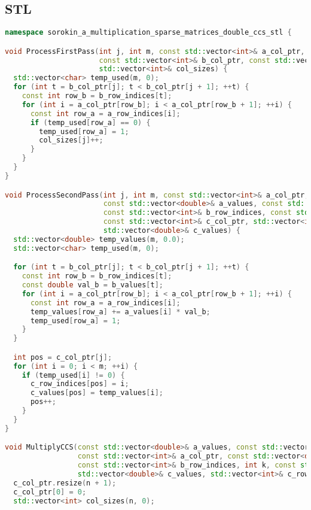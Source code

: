 \documentclass[12pt]{article}
\begin{document}
\subsection*{STL}
\begin{lstlisting}[language=C++]
namespace sorokin_a_multiplication_sparse_matrices_double_ccs_stl {

void ProcessFirstPass(int j, int m, const std::vector<int>& a_col_ptr, const std::vector<int>& a_row_indices,
                      const std::vector<int>& b_col_ptr, const std::vector<int>& b_row_indices,
                      std::vector<int>& col_sizes) {
  std::vector<char> temp_used(m, 0);
  for (int t = b_col_ptr[j]; t < b_col_ptr[j + 1]; ++t) {
    const int row_b = b_row_indices[t];
    for (int i = a_col_ptr[row_b]; i < a_col_ptr[row_b + 1]; ++i) {
      const int row_a = a_row_indices[i];
      if (temp_used[row_a] == 0) {
        temp_used[row_a] = 1;
        col_sizes[j]++;
      }
    }
  }
}

void ProcessSecondPass(int j, int m, const std::vector<int>& a_col_ptr, const std::vector<int>& a_row_indices,
                       const std::vector<double>& a_values, const std::vector<int>& b_col_ptr,
                       const std::vector<int>& b_row_indices, const std::vector<double>& b_values,
                       const std::vector<int>& c_col_ptr, std::vector<int>& c_row_indices,
                       std::vector<double>& c_values) {
  std::vector<double> temp_values(m, 0.0);
  std::vector<char> temp_used(m, 0);

  for (int t = b_col_ptr[j]; t < b_col_ptr[j + 1]; ++t) {
    const int row_b = b_row_indices[t];
    const double val_b = b_values[t];
    for (int i = a_col_ptr[row_b]; i < a_col_ptr[row_b + 1]; ++i) {
      const int row_a = a_row_indices[i];
      temp_values[row_a] += a_values[i] * val_b;
      temp_used[row_a] = 1;
    }
  }

  int pos = c_col_ptr[j];
  for (int i = 0; i < m; ++i) {
    if (temp_used[i] != 0) {
      c_row_indices[pos] = i;
      c_values[pos] = temp_values[i];
      pos++;
    }
  }
}

void MultiplyCCS(const std::vector<double>& a_values, const std::vector<int>& a_row_indices, int m,
                 const std::vector<int>& a_col_ptr, const std::vector<double>& b_values,
                 const std::vector<int>& b_row_indices, int k, const std::vector<int>& b_col_ptr,
                 std::vector<double>& c_values, std::vector<int>& c_row_indices, int n, std::vector<int>& c_col_ptr) {
  c_col_ptr.resize(n + 1);
  c_col_ptr[0] = 0;
  std::vector<int> col_sizes(n, 0);


\end{lstlisting}
\end{document}
